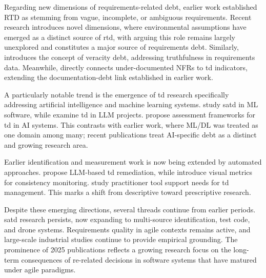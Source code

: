 \documentclass[12pt,reqno, twoside]{amsbook}
\theoremstyle{plain}
\numberwithin{equation}{chapter}
\numberwithin{section}{chapter}
\begin{document}
Regarding new dimensions of requirements-related debt, earlier work established RTD as stemming from vague, incomplete, or ambiguous requirements. Recent research introduces novel dimensions, where environmental assumptions have emerged as a distinct source of \gls{rtd}, with \textcite{Alenazi2025c} arguing this role remains largely unexplored and constitutes a major source of requirements debt. Similarly, \textcite{Perera2025} introduces the concept of veracity debt, addressing truthfulness in requirements data. Meanwhile, \textcite{Scott2025} directly connects under-documented NFRs to \gls{td} indicators, extending the documentation-debt link established in earlier work.

A particularly notable trend is the emergence of \gls{td} research specifically addressing artificial intelligence and machine learning systems. \textcite{Bhatia2025} study \gls{satd} in ML software, while \textcite{Aljohani2025} examine \gls{td} in LLM projects. \textcite{Sklavenitis2025} propose assessment frameworks for \gls{td} in AI systems. This contrasts with earlier work, where ML/DL was treated as one domain among many; recent publications treat AI-specific debt as a distinct and growing research area.

Earlier identification and measurement work is now being extended by automated approaches. \textcite{Tornhill2025} propose LLM-based \gls{td} remediation, while \textcite{Kegel2025} introduce visual metrics for consistency monitoring. \textcite{Biazotto2025} study practitioner tool support needs for \gls{td} management. This marks a shift from descriptive toward prescriptive research.

Despite these emerging directions, several threads continue from earlier periods. \gls{satd} research persists, now expanding to multi-source identification, test code, and drone systems. Requirements quality in agile contexts remains active, and large-scale industrial studies continue to provide empirical grounding. The prominence of 2025 publications reflects a growing research focus on the long-term consequences of \gls{re}-related decisions in software systems that have matured under agile paradigms.
\end{document}

